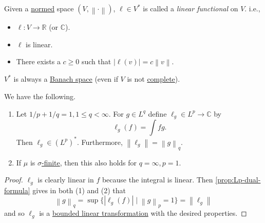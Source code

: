 \begin{definition}\label{def:linear-functional}
	Given a \hyperref[def:norm]{normed} space \((V, \left\lVert \cdot\right\rVert )\), \(\ell \in V^\ast\) is called a \emph{linear functional} on \(V\). i.e.,
	\begin{itemize}
		\item \(\ell \colon V \to \mathbb{R}\) (or \(\mathbb{C} \)).
		\item \(\ell \) is linear.
		\item There exists a \(c \geq 0\) such that \(\left\vert \ell(v) \right\vert  = c\left\lVert v\right\rVert\).
	\end{itemize}
\end{definition}

\begin{note}
	\(V^\ast\) is always a \hyperref[def:Banach-space]{Banach space} (even if \(V\) is not \hyperref[def:complete]{complete}).
\end{note}

\begin{corollary}\label{col:lp-lq-isometric}
	We have the following.
	\begin{enumerate}[(1)]
		\item Let \(1/p + 1/q = 1, 1 \leq q < \infty\). For \(g \in L^q\) define \(\ell_g \in L^p \to \mathbb{C}\) by
		      \[
			      \ell_g(f) = \int fg.
		      \]
		      Then \(\ell_g \in (L^p)^\ast\). Furthermore, \(\left\lVert \ell_g\right\rVert = \left\lVert g\right\rVert_q\).
		\item If \(\mu\) is \hyperref[def:finite-measure]{\(\sigma \)-finite}, then this also holds for \(q = \infty, p = 1\).
	\end{enumerate}
\end{corollary}
\begin{proof}
	\(\ell_g\) is clearly linear in \(f\) because the integral is linear. Then \autoref{prop:Lp-dual-formula} gives in both (1) and (2) that
	\[
		\left\lVert g\right\rVert_q = \sup\{\left\vert \ell_g(f) \right\vert  \mid \left\lVert g\right\rVert _p = 1 \} = \left\lVert \ell_g\right\rVert
	\]
	and so \(\ell_g\) is a \hyperref[def:bounded-linear-transformation]{bounded linear transformation} with the desired properties.
\end{proof}

